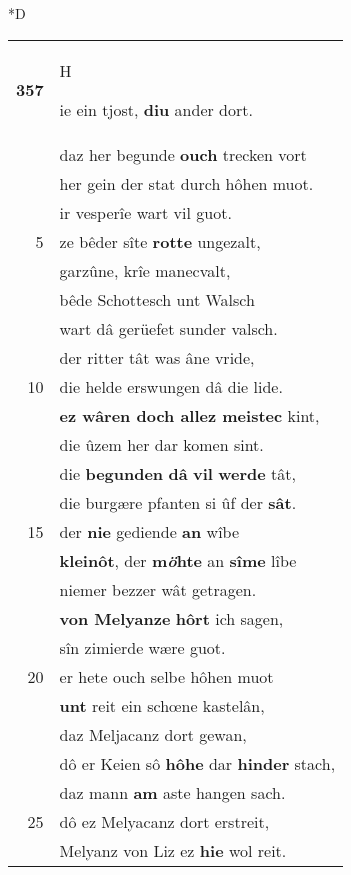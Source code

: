 \documentclass[8pt,a4paper,notitlepage]{article}
\begin{document}
\begin{table}[ht]
\begin{minipage}[t]{0.5\linewidth}
\small
\begin{center}*D
\end{center}
\begin{tabular}{rl}
\textbf{357} & \begin{large}H\end{large}ie ein tjost, \textbf{diu} ander dort.\\ 
 & daz her begunde \textbf{ouch} trecken vort\\ 
 & her gein der stat durch hôhen muot.\\ 
 & ir vesperîe wart vil guot.\\ 
5 & ze bêder sîte \textbf{rotte} ungezalt,\\ 
 & garzûne, krîe manecvalt,\\ 
 & bêde Schottesch unt Walsch\\ 
 & wart dâ gerüefet sunder valsch.\\ 
 & der ritter tât was âne vride,\\ 
10 & die helde erswungen dâ die lide.\\ 
 & \textbf{ez wâren doch allez meistec} kint,\\ 
 & die ûzem her dar komen sint.\\ 
 & die \textbf{begunden} \textbf{dâ} \textbf{vil} \textbf{werde} tât,\\ 
 & die burgære pfanten si ûf der \textbf{sât}.\\ 
15 & der \textbf{nie} gediende \textbf{an} wîbe\\ 
 & \textbf{kleinôt}, der \textbf{m\textit{ö}hte} an \textbf{sîme} lîbe\\ 
 & niemer bezzer wât getragen.\\ 
 & \textbf{von Melyanze} \textbf{hôrt} ich sagen,\\ 
 & sîn zimierde wære guot.\\ 
20 & er hete ouch selbe hôhen muot\\ 
 & \textbf{unt} reit ein schœne kastelân,\\ 
 & daz Meljacanz dort gewan,\\ 
 & dô er Keien sô \textbf{hôhe} dar \textbf{hinder} stach,\\ 
 & daz mann \textbf{am} aste hangen sach.\\ 
25 & dô ez Melyacanz dort erstreit,\\ 
 & Melyanz von Liz ez \textbf{hie} wol reit.\\ 

\end{tabular}
\end{minipage}
\end{table}
\end{document}
